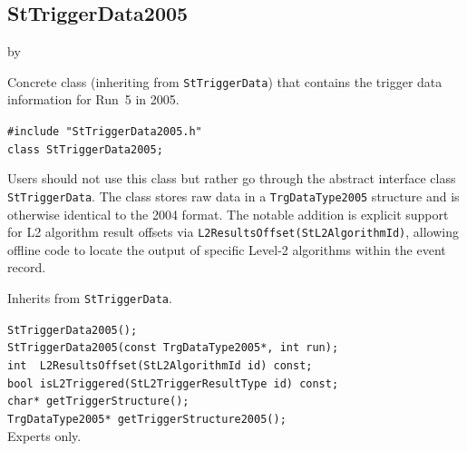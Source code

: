 \documentclass[twoside]{article}
\newcommand{\entrylabel}[1]{\mbox{\textbf{{#1}}}\hfil}%
\newenvironment{entry}
{\begin{list}{}%
    {\renewcommand{\makelabel}{\entrylabel}%
     \setlength{\labelwidth}{90pt}%
     \setlength{\leftmargin}{\labelwidth}
     \advance\leftmargin by \labelsep%
      }%
    }%
  {\end{list}}
\newcommand{\Entrylabel}[1]%
{\raisebox{0pt}[1ex][0pt]{\makebox[\labelwidth][l]%
    {\parbox[t]{\labelwidth}{\hspace{0pt}\textbf{{#1}}}}}}
\newenvironment{Entry}%
{\renewcommand{\entrylabel}{\Entrylabel}\begin{entry}}%
  {\end{entry}}
\begin{document}
\subsection{StTriggerData2005}
\label{sec:StTriggerData2005}
\begin{Entry}
\item[Summary] Concrete class (inheriting from \texttt{StTriggerData}) that
    contains the trigger data information for Run~5 in 2005.
\item[Synopsis]
    \verb+#include "StTriggerData2005.h"+\\
    \verb+class StTriggerData2005;+\\
\item[Description] Users should not use this class but rather go through the
    abstract interface class \texttt{StTriggerData}.  The class stores raw data
    in a \verb+TrgDataType2005+ structure and is otherwise identical to the 2004
    format.  The notable addition is explicit support for L2 algorithm result
    offsets via \verb+L2ResultsOffset(StL2AlgorithmId)+, allowing offline code
    to locate the output of specific Level-2 algorithms within the event record.
\item[Related Classes] Inherits from \texttt{StTriggerData}.
\item[Public\\ Constructors]
    \verb+StTriggerData2005();+\\
    \verb+StTriggerData2005(const TrgDataType2005*, int run);+\\
    \verb+int  L2ResultsOffset(StL2AlgorithmId id) const;+\\
    \verb+bool isL2Triggered(StL2TriggerResultType id) const;+\\
    \verb+char* getTriggerStructure();+\\
    \verb+TrgDataType2005* getTriggerStructure2005();+\\
    Experts only.
\end{Entry}
\clearpage
\end{document}
